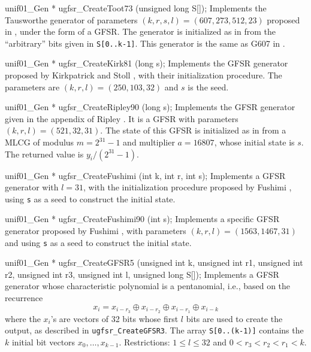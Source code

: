 unif01_Gen * ugfsr_CreateToot73 (unsigned long S[]);
\endcode
  \tab Implements the Tausworthe generator
   of parameters $(k,r,s,l) = (607, 273, 512, 23)$  proposed
   in \cite{rTOO73a}, under the form of a GFSR.
   The generator is initialized as in \cite{rTOO73a}
%
   from the ``arbitrary'' bits  given in {\tt S[0..k-1]}.
   This generator is the same as G607 in \cite{rMAT94a}.
\endtab
\code


unif01_Gen * ugfsr_CreateKirk81 (long s);
\endcode
  \tab Implements the GFSR generator proposed by
   Kirkpatrick and Stoll \cite{rKIR81a}, with their
%
   initialization procedure.
   The parameters are $(k,r,l) = (250, 103, 32)$ and $s$ is the seed.
  \endtab
\code


unif01_Gen * ugfsr_CreateRipley90 (long s);
\endcode
  \tab Implements the GFSR generator given in the appendix
   of Ripley \cite{rRIP90a}.
%
   It is a GFSR with parameters $(k, r, l) = (521, 32, 31)$.
   The state of this GFSR is initialized as in \cite{rRIP90a}
   from a MLCG of modulus $m=2^{31}-1$ and  multiplier
   $a = 16807$, whose initial state is $s$. The returned value
   is $y_i/(2^{31} - 1)$.
  \endtab
\code


unif01_Gen * ugfsr_CreateFushimi (int k, int r, int s);
\endcode
  \tab Implements a GFSR generator with $l = 31$, with the
%
   initialization procedure proposed by Fushimi \cite{rFUS90a},
   using {\tt s} as a seed to construct the initial state.
  \endtab
\code


unif01_Gen * ugfsr_CreateFushimi90 (int s);
\endcode
  \tab Implements a specific GFSR generator proposed by
   Fushimi \cite{rFUS90a}, with parameters $(k,r,l) = (1563, 1467, 31)$
   and using {\tt s} as a seed to construct the initial state.
  \endtab
\code


unif01_Gen * ugfsr_CreateGFSR5 (unsigned int k, unsigned int r1,
                                unsigned int r2, unsigned int r3,
                                unsigned int l, unsigned long S[]);
\endcode
  \tab Implements a GFSR generator whose characteristic polynomial
   is a pentanomial, i.e., based on the recurrence
    $$ x_i = x_{i-r_3} \oplus x_{i-r_2} \oplus x_{i-r_1} \oplus x_{i-k} $$
   where the $x_i$'s are vectors of 32  bits whose first  $l$
   bits are used to create the output, as described in
   {\tt ugfsr\_CreateGFSR3}.    The array {\tt S[0..(k-1)]}
   contains the $k$ initial bit vectors $x_0, \dots, x_{k-1}$.
   Restrictions: $1 \le l \le 32$ and $0 < r_3 < r_2 < r_1 < k$.
  \endtab
\code


